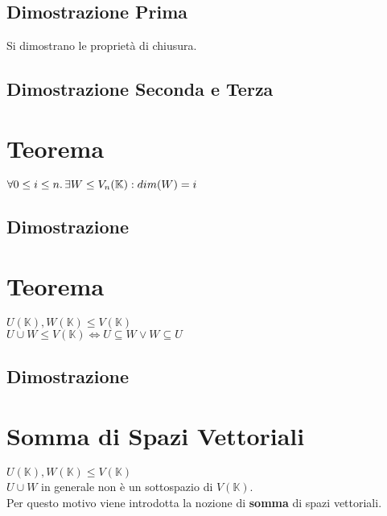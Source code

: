 \documentclass[a4paper, twoside, italian, 11pt]{book}
\newcommand{\K}{\mathbb K}
\begin{document}
\subsection{Dimostrazione Prima}


Si dimostrano le proprietà di chiusura.


\subsection{Dimostrazione Seconda e Terza}




\section{Teorema}

$\forall 0 \leq i \leq n \ldotp \exists W \leq V_n(\K) : dim(W) = i$


\subsection {Dimostrazione}




\section{Teorema}

$U(\K), W(\K) \leq V(\K)$ \\

\noindent
$U \cup W  \leq V(\K) \iff U \subseteq W \lor W \subseteq U$


\subsection{Dimostrazione}




\section{Somma di Spazi Vettoriali}

$U(\K), W(\K) \leq V(\K)$ \\

\noindent
$U \cup W$ in generale non è un sottospazio di $V(\K)$. \\
Per questo motivo viene introdotta la nozione di \textbf{somma} di spazi vettoriali. \\
\end{document}

